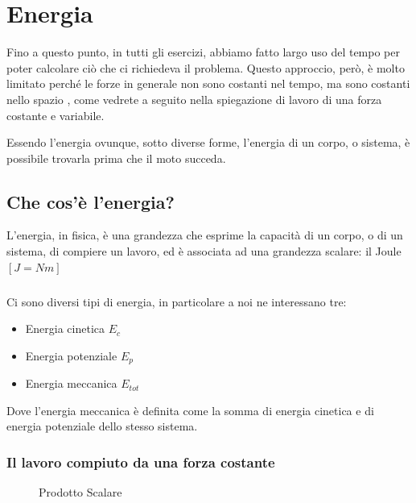 \chapter{Energia}
Fino a questo punto, in tutti gli esercizi, abbiamo fatto largo uso del tempo per poter calcolare ciò che ci richiedeva il problema.
Questo approccio, però, è molto limitato perché le forze in generale non sono costanti nel tempo, ma sono costanti nello spazio \label{costantiSpazio}, come vedrete a seguito nella spiegazione di lavoro di una forza costante e variabile.

Essendo l’energia ovunque, sotto diverse forme, l'energia di un corpo, o sistema, è possibile trovarla prima che il moto succeda.

\section{Che cos'è l'energia? }
L’energia, in fisica, è una grandezza che esprime la capacità di un corpo, o di un sistema, di compiere un lavoro, ed è associata ad una grandezza scalare: il Joule $[J = Nm]$
\paragraph{}
Ci sono diversi tipi di energia, in particolare a noi ne interessano tre:

\begin{itemize}
    \item Energia cinetica $E_c$
    \item Energia potenziale $E_p$
    \item Energia meccanica $E_{tot}$
\end{itemize}

Dove l’energia meccanica è definita come la somma di energia cinetica e di energia potenziale dello stesso sistema. 

\newpage
\subsection{Il lavoro compiuto da una forza costante}

\begin{figure}[tb]
    \centering
    \caption{Prodotto Scalare}
    \label{fig:prodScalare}
\end{figure}

